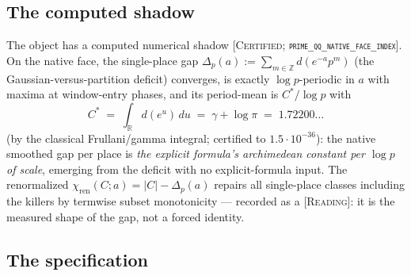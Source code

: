 \documentclass[11pt,reqno]{amsart}
\theoremstyle{plain}
\theoremstyle{definition}
\theoremstyle{remark}
\newcommand{\R}{\mathbb{R}}
\newcommand{\Z}{\mathbb{Z}}
\newcommand{\grade}[1]{\textup{[\textsc{#1}]}}
\begin{document}
\subsection{The computed shadow}

The object has a computed numerical shadow \grade{Certified;
\texttt{prime\_\allowbreak qq\_\allowbreak native\_\allowbreak face\_\allowbreak index}}. On the native face, the single-place gap
$\Delta_p(a) := \sum_{m \in \Z} d(e^{-a}p^m)$ (the Gaussian-versus-partition deficit)
converges, is exactly $\log p$-periodic in $a$ with maxima at window-entry phases, and its
period-mean is $C^*/\log p$ with
\[
C^* \;=\; \int_\R d(e^u)\, du \;=\; \gamma + \log\pi \;=\; 1.72200\ldots
\]
(by the classical Frullani/gamma integral; certified to $1.5\cdot10^{-36}$): the native
smoothed gap per place is \emph{the explicit formula's archimedean constant per $\log p$ of
scale}, emerging from the deficit with no explicit-formula input. The renormalized
$\chi_{\mathrm{ren}}(C; a) = |C| - \Delta_p(a)$ repairs all single-place classes including
the killers by termwise subset monotonicity --- recorded as a \grade{Reading}: it is the
measured shape of the gap, not a forced identity.

\subsection{The specification}
\end{document}
